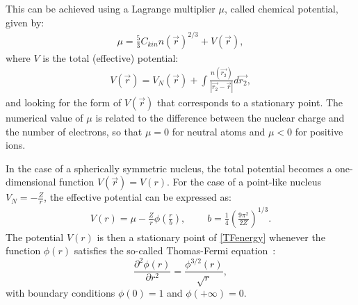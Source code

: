 This can be achieved using a Lagrange multiplier $\mu$, called chemical potential, given by:
\begin{align}
\mu = \frac{5}{3} C_{kin} n(\vec{r})^{2/3} + V(\vec{r}),
\end{align}
where $V$ is the total (effective) potential:
\begin{align}
V(\vec{r}) = V_{N}(\vec{r}) + \int \frac{n(\vec{r_2})}{|\vec{r_2}-\vec{r}|} d\vec{r_2},
\end{align}
and looking for the form of $V(\vec{r})$ that corresponds to a stationary point. The numerical value of $\mu$ is related to the difference between the nuclear charge and the number of electrons, so that $\mu = 0$ for neutral atoms and $\mu < 0$ for positive ions.

In the case of a spherically symmetric nucleus, the total potential becomes a one-dimensional function $V(\vec{r}) = V(r)$. For the case of a point-like nucleus $V_N = -\frac{Z}{r}$, the effective potential can be expressed as:
\begin{align}
V(r) = \mu - \frac{Z}{r} \phi \left(\frac{r}{b}\right),~~~~~~~~~~b=\frac{1}{4}\left(\frac{9\pi^2}{2Z}\right)^{1/3}.
\end{align}
The potential $V(r)$ is then a stationary point of \eqref{TFenergy} whenever the function $\phi(r)$ satisfies the so-called Thomas-Fermi equation~\cite{davis1962introduction}:
\begin{equation} \label{TFequation}
    \frac{\partial^2 \phi(r)}{\partial r^2} = \frac{\phi^{3/2}(r)}{\sqrt{r}},
\end{equation}
with boundary conditions $\phi(0)=1$ and $\phi(+\infty)=0$.

